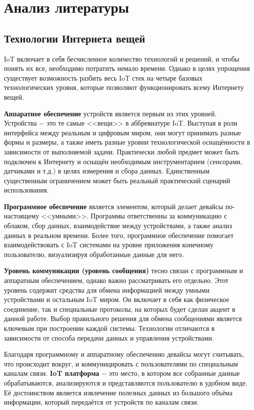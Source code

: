 \chapter{Анализ литературы}


	\setcounter{subsection}{-1}
	\section{Технологии Интернета вещей}
	IoT включает в себя бесчисленное количество технологий и решений, и чтобы понять их все, необходимо
	потратить немало времени. Однако в целях упрощения существует возможность разбить весь IoT стек на
	четыре базовых технологических уровня, которые позволяют функционировать всему Интернету вещей.
	
	\textbf{Аппаратное обеспечение} устройств является первым из этих уровней. Устройства $-$ это те самые
	<<вещи>> в аббревиатуре IoT. Выступая в роли интерфейса между реальным и цифровым миром, они
	могут принимать разные формы и размеры, а также иметь разные уровни технологической оснащённости в
	зависимости от выполняемой задачи. Практически любой предмет может быть подключен к Интернету и
	оснащён необходимым инструментарием (сенсорами, датчиками и т.д.) в целях измерения и сбора данных.
	Единственным существенным ограничением может быть реальный практический сценарий использования.
	
	\textbf{Программное обеспечение} является элементом, который делает девайсы по-настоящему <<умными>>.
	Программы ответственны за коммуникацию с облаком, сбор данных, взаимодействие между устройствами,
	а также анализ данных в реальном времени. Более того, программное обеспечение помогает взаимодействовать
	с IoT системами на уровне приложения конечному пользователю, визуализируя обработанные данные для него.
	
	\textbf{Уровень коммуникации (уровень сообщения)} тесно связан с программным и аппаратным обеспечением, однако
	важно рассматривать его отдельно. Этот уровень содержит средства для обмена
	информацией между умными устройствами и остальным IoT миром. Он включает в себя как физическое соединение,
	так и специальные протоколы, на которых будет сделан акцент в данной работе. Выбор правильного решения
	для обмена сообщениями является ключевым при построении каждой системы. Технологии отличаются в
	зависимости от способа передачи данных и управления устройствами.
	
	Благодаря программному и аппаратному обеспечению девайсы могут считывать, что происходит вокруг, и
	коммуницировать с пользователями по специальным каналам связи. \textbf{IoT платформа} $-$ это место, в котором
	все собранные данные обрабатываются, анализируются и представляются пользователю в удобном виде.
	Её достоинством является извлечение полезных данных из большого объёма информации, который передаётся
	от устройств по каналам связи.
	
